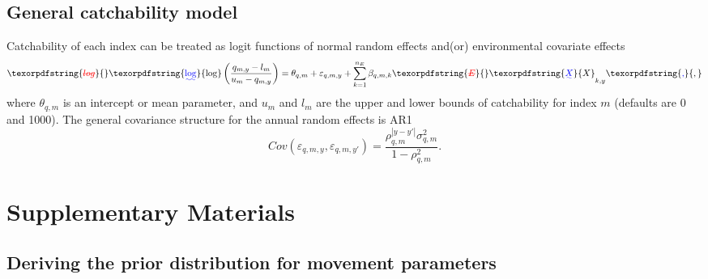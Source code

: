 \documentclass[
]{article}
\makeatletter
\providecommand{\DIFaddtex}[1]{{\protect\color{blue}\uwave{#1}}} %
\providecommand{\DIFdeltex}[1]{{\protect\color{red}\sout{#1}}} %
\providecommand{\DIFaddbegin}{} %
\providecommand{\DIFaddend}{} %
\providecommand{\DIFdelbegin}{} %
\providecommand{\DIFdelend}{} %
\providecommand{\DIFadd}[1]{\texorpdfstring{\DIFaddtex{#1}}{#1}} %
\providecommand{\DIFdel}[1]{\texorpdfstring{\DIFdeltex{#1}}{}} %
\newcommand{\DIFscaledelfig}{0.5}
\newlength{\DIFdelgraphicswidth} %
\newlength{\DIFdelgraphicsheight} %
\newcommand{\DIFaddincludegraphics}[2][]{{\color{blue}\fbox{\DIFOincludegraphics[#1]{#2}}}} %
\newcommand{\DIFdelincludegraphics}[2][]{%
\sbox{\DIFdelgraphicsbox}{\DIFOincludegraphics[#1]{#2}}%
\settoboxwidth{\DIFdelgraphicswidth}{\DIFdelgraphicsbox} %
\settoboxtotalheight{\DIFdelgraphicsheight}{\DIFdelgraphicsbox} %
\scalebox{\DIFscaledelfig}{%
\parbox[b]{\DIFdelgraphicswidth}{\usebox{\DIFdelgraphicsbox}\\[-\baselineskip] \rule{\DIFdelgraphicswidth}{0em}}\llap{\resizebox{\DIFdelgraphicswidth}{\DIFdelgraphicsheight}{%
\setlength{\unitlength}{\DIFdelgraphicswidth}%
\begin{picture}(1,1)%
\thicklines\linethickness{2pt} %
{\color[rgb]{1,0,0}\put(0,0){\framebox(1,1){}}}%
{\color[rgb]{1,0,0}\put(0,0){\line( 1,1){1}}}%
{\color[rgb]{1,0,0}\put(0,1){\line(1,-1){1}}}%
\end{picture}%
}\hspace*{3pt}}} %
} %
\DeclareRobustCommand{\DIFaddbegin}{\DIFOaddbegin \let\includegraphics\DIFaddincludegraphics} %
\DeclareRobustCommand{\DIFaddend}{\DIFOaddend \let\includegraphics\DIFOincludegraphics} %
\DeclareRobustCommand{\DIFdelbegin}{\DIFOdelbegin \let\includegraphics\DIFdelincludegraphics} %
\DeclareRobustCommand{\DIFdelend}{\DIFOaddend \let\includegraphics\DIFOincludegraphics} %
\let\sout@orig\sout %
\renewcommand{\sout}[1]{\ifmmode\text{\sout@orig{\ensuremath{#1}}}\else\sout@orig{#1}\fi} %
\makeatother
\begin{document}
\hypertarget{general-catchability-model}{%
\subsection*{General catchability model}\label{general-catchability-model}}

Catchability of each index can be treated as logit functions of normal random effects and(or) environmental covariate effects
\begin{equation*}
\DIFdelbegin \DIFdel{log }\DIFdelend \DIFaddbegin \DIFadd{\log }\left(\DIFaddend \frac{q_{m,y}-l_m}{u_m-q_{m,y}}\DIFaddbegin \right) \DIFaddend = \theta_{q,m} + \varepsilon_{q,m,y}  + \sum^{n_E}_{k=1} \beta_{q,m,k} \DIFdelbegin \DIFdel{E}\DIFdelend \DIFaddbegin \DIFadd{X}\DIFaddend _{k,y}\DIFaddbegin \DIFadd{,
}\DIFaddend \end{equation*}
where \(\theta_{q,m}\) is an intercept or mean parameter, and \(u_{m}\) and \(l_{m}\) are the upper and lower bounds of catchability for index \(m\) (defaults are 0 and 1000). The general covariance structure for the annual random effects is AR1
\begin{equation*}
Cov\left(\varepsilon_{q,m,y},\varepsilon_{q,m,y'}\right) =   \frac{\rho_{q,m}^{|y-y'|}\sigma^2_{q,m}}{1 - \rho_{q,m}^2}.
\end{equation*}

\pagebreak

\hypertarget{supplementary-materials}{%
\section*{Supplementary Materials}\label{supplementary-materials}}

\hypertarget{deriving-the-prior-distribution-for-movement-parameters}{%
\subsection*{Deriving the prior distribution for movement parameters}\label{deriving-the-prior-distribution-for-movement-parameters}}
\end{document}
